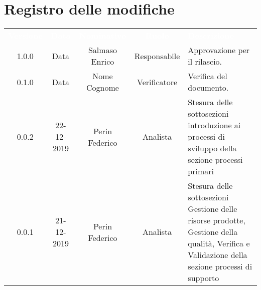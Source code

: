 \section*{Registro delle modifiche}
{
\renewcommand{\arraystretch}{1.5}
\centering
\begin{longtable}{ c c  c  c C{4cm}}
\textcolor{white}{\textbf{Versione}} & \textcolor{white}{\textbf{Data}} & \textcolor{white}{\textbf{Nominativo}} & \textcolor{white}{\textbf{Ruolo}} & \textcolor{white}{\textbf{Descrizione}}\\	


1.0.0 & Data & Salmaso Enrico & Responsabile & Approvazione per il rilascio.  \\
		
0.1.0 & Data & Nome Cognome & Verificatore & Verifica del documento.  \\

0.0.2 & 22-12-2019 & Perin Federico & Analista & Stesura delle sottosezioni introduzione ai processi di sviluppo della sezione processi primari\\
		
0.0.1 & 21-12-2019 & Perin Federico & Analista & Stesura delle sottosezioni Gestione delle risorse prodotte, Gestione della qualità, Verifica e Validazione della sezione processi di supporto \\
		
		
\end{longtable}
}